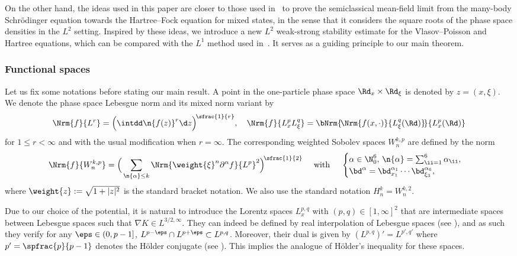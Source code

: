 On the other hand, the ideas used in this paper are closer to those used in~\cite{benedikter_mean-field_2016-1, chong_many-body_2021} to prove the semiclassical mean-field limit from the many-body Schrödinger equation towards the Hartree--Fock equation for mixed states, in the sense that it considers the square roots of the phase space densities in the $L^2$ setting. Inspired by these ideas, we introduce a new $L^2$ weak-strong stability estimate for the Vlasov--Poisson and Hartree equations, which can be compared with the $L^1$ method used in~\cite{lafleche_strong_2021}. It serves as a guiding principle to our main theorem.


\subsubsection{Functional spaces} Let us fix some notations before stating our main result. A point in the one-particle phase space $\Rd_x\times \Rd_{\xi}$ is denoted by $z = (x, \xi)$. We denote the phase space Lebesgue norm and its mixed norm variant by
\begin{equation*}
\Nrm{f}{L^r} = \Big(\intdd \n{f(z)}^r\d z\Big)^{\!\sfrac{1}{r}}, \quad \Nrm{f}{L^p_x L^q_{\xi}} = \bNrm{\!\Nrm{f(x, \cdot)}{L^q_{\xi}(\Rd)}\!}{L^p_x(\Rd)}
\end{equation*}
for $1\le r<\infty$ and with the usual modification when $r=\infty$. The corresponding weighted Sobolev spaces $W^{k,p}_n$ are defined by the norm
\begin{equation*}
\Nrm{f}{W^{k,p}_{n}} = \Big(\sum_{\substack{ \n{\alpha} \le k}}\Nrm{\weight{\xi}^n\partial^\alpha f}{L^{p}}^2\Big)^{\!\sfrac{1}{2}}\quad \text{ with }\quad
\begin{cases}
\alpha \in {\N_{0}^6},\, \n{\alpha}= \sum^6_{\ii=1} \alpha_{\ii},
\\
\bd^\alpha = \bd_{x_1}^{\alpha_1}\cdots \bd_{\xi_3}^{\alpha_6},
\end{cases}
\end{equation*}
where $\weight{z}:=\sqrt{1+|z|^2}$ is the standard bracket notation. We also use the standard notation $H^{k}_{n} = W^{k,2}_{n}$.

Due to our choice of the potential, it is natural to introduce the Lorentz spaces $L^{p,q}_x$ with $(p,q)\in[1,\infty]^2$ that are intermediate spaces between Lebesgue spaces such that $\nabla K \in L^{3/2,\infty}$. They can indeed be defined by real interpolation of Lebesgue spaces (see \eg \cite[Th.\,5.3.1]{bergh_interpolation_1976}), and as such they verify for any $\eps\in(0,p-1]$, $L^{p-\eps} \cap L^{p+\eps} \subset L^{p,q}$. Moreover, their dual is given by $(L^{p,q})' = L^{p',q'}$ where $p' = \spfrac{p}{p-1}$ denotes the Hölder conjugate (see \eg \cite{hunt_lpq_1966}). This implies the analogue of Hölder's inequality for these spaces.

